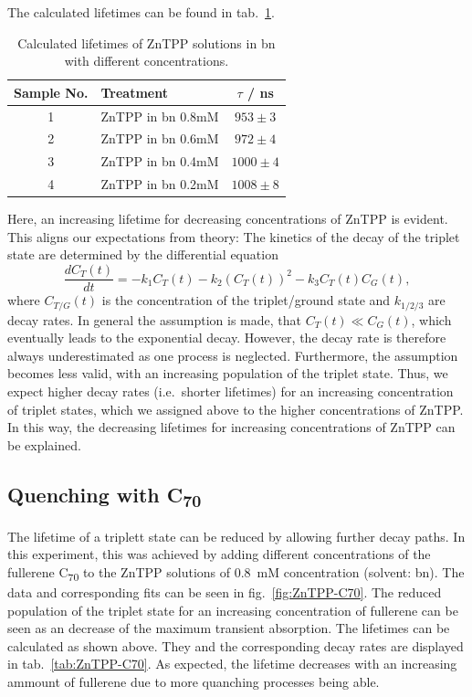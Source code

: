 The calculated lifetimes can be found in tab.~\ref{tab:lifetimesConc}.

\begin{table}[ht]
    \centering
    \begin{tabular}{clc}
        \toprule
        Sample No. &    Treatment &    $\tau$ / \si{\nano\second} \\
        \midrule
        1 &     ZnTPP in bn 0.8mM &  $953 \pm 3$ \\
        2 &     ZnTPP in bn 0.6mM &  $972 \pm 4$ \\
        3 &     ZnTPP in bn 0.4mM & $1000 \pm 4$ \\
        4 &     ZnTPP in bn 0.2mM & $1008 \pm 8$ \\
        \bottomrule
    \end{tabular}
    \caption{Calculated lifetimes of ZnTPP solutions in bn with different concentrations.}
    \label{tab:lifetimesConc}
\end{table}

Here, an increasing lifetime for decreasing concentrations of ZnTPP is evident. This aligns our expectations from theory: The kinetics of the decay of the triplet state are determined by the differential equation 
\begin{equation}
    \frac{dC_T(t)}{dt} = - k_1C_T(t) - k_2(C_T(t))^2 - k_3 C_T(t)C_G(t),
\end{equation}
where $C_{T/G}(t)$ is the concentration of the triplet/ground state and $k_{1/2/3}$ are decay rates. In general the assumption is made, that $C_T(t) \ll C_G(t)$, which eventually leads to the exponential decay. However, the decay rate is therefore always underestimated as one process is neglected. Furthermore, the assumption becomes less valid, with an increasing population of the triplet state. Thus, we expect higher decay rates (i.e.~shorter lifetimes) for an increasing concentration of triplet states, which we assigned above to the higher concentrations of ZnTPP. In this way, the decreasing lifetimes for increasing concentrations of ZnTPP can be explained.

\subsection*{Quenching with C\textsubscript{70}}
The lifetime of a triplett state can be reduced by allowing further decay paths. In this experiment, this was achieved by adding different concentrations of the fullerene C\textsubscript{70} to the ZnTPP solutions of \SI{0.8}{\milli\nauticalmile} concentration (solvent: bn). The data and corresponding fits can be seen in fig.~\ref{fig:ZnTPP-C70}. The reduced population of the triplet state for an increasing concentration of fullerene can be seen as an decrease of the maximum transient absorption. The lifetimes can be calculated as shown above. They and the corresponding decay rates are displayed in tab.~\ref{tab:ZnTPP-C70}. As expected, the lifetime decreases with an increasing ammount of fullerene due to more quanching processes being able. 

